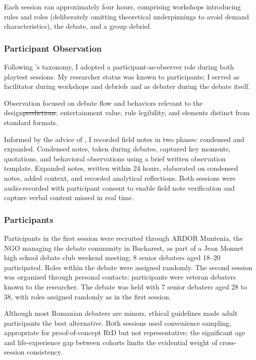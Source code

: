 \documentclass[12pt]{article}
\makeatletter
\providecommand{\DIFaddtex}[1]{{\protect\color[rgb]{0,0.5,0}\uwave{#1}}} %
\providecommand{\DIFdeltex}[1]{{\protect\color{red}\sout{#1}}} %
\providecommand{\DIFaddbegin}{} %
\providecommand{\DIFaddend}{} %
\providecommand{\DIFdelbegin}{} %
\providecommand{\DIFdelend}{} %
\providecommand{\DIFadd}[1]{\texorpdfstring{\DIFaddtex{#1}}{#1}} %
\providecommand{\DIFdel}[1]{\texorpdfstring{\DIFdeltex{#1}}{}} %
\providecommand{\DIFscaledelfig}{0.5}
\newlength{\DIFdelgraphicswidth} %
\newlength{\DIFdelgraphicsheight} %
\providecommand{\DIFaddincludegraphics}[2][]{{\color[rgb]{0,0.5,0}\fbox{\DIFOincludegraphics[#1]{#2}}}} %
\providecommand{\DIFdelincludegraphics}[2][]{%
\sbox{\DIFdelgraphicsbox}{\DIFOincludegraphics[#1]{#2}}%
\settoboxwidth{\DIFdelgraphicswidth}{\DIFdelgraphicsbox} %
\settoboxtotalheight{\DIFdelgraphicsheight}{\DIFdelgraphicsbox} %
\scalebox{\DIFscaledelfig}{%
\parbox[b]{\DIFdelgraphicswidth}{\usebox{\DIFdelgraphicsbox}\\[-\baselineskip] \rule{\DIFdelgraphicswidth}{0em}}\llap{\resizebox{\DIFdelgraphicswidth}{\DIFdelgraphicsheight}{%
\setlength{\unitlength}{\DIFdelgraphicswidth}%
\begin{picture}(1,1)%
\thicklines\linethickness{2pt} %
{\color[rgb]{1,0,0}\put(0,0){\framebox(1,1){}}}%
{\color[rgb]{1,0,0}\put(0,0){\line( 1,1){1}}}%
{\color[rgb]{1,0,0}\put(0,1){\line(1,-1){1}}}%
\end{picture}%
}\hspace*{3pt}}} %
} %
\DeclareRobustCommand{\DIFaddbegin}{\DIFOaddbegin \let\includegraphics\DIFaddincludegraphics} %
\DeclareRobustCommand{\DIFaddend}{\DIFOaddend \let\includegraphics\DIFOincludegraphics} %
\DeclareRobustCommand{\DIFdelbegin}{\DIFOdelbegin \let\includegraphics\DIFdelincludegraphics} %
\DeclareRobustCommand{\DIFdelend}{\DIFOaddend \let\includegraphics\DIFOincludegraphics} %
\let\sout@orig\sout %
\renewcommand{\sout}[1]{\ifmmode\text{\sout@orig{\ensuremath{#1}}}\else\sout@orig{#1}\fi} %
\makeatother
\begin{document}
Each session ran approximately four hours, comprising workshops introducing rules and roles (deliberately omitting theoretical underpinnings to avoid demand characteristics), the debate, and a group debrief.

\subsubsection{Participant Observation}

Following \textcite{baker2006observation}'s taxonomy, I adopted a participant-as-observer role during both playtest sessions. My researcher status was known to participants; I served as facilitator during workshops and debriefs and as debater during the debate itself.

Observation focused on debate flow and behaviors relevant to the design\DIFdelbegin \DIFdel{predictions}\DIFdelend \DIFaddbegin \DIFadd{'s intentions}\DIFaddend : entertainment value, rule legibility, and elements distinct from standard formats.

Informed by the advice of \textcite{spradley1980participant}, I recorded field notes in two phases: condensed and expanded. Condensed notes, taken during debates, captured key moments, quotations, and behavioral observations using a brief written observation template. Expanded notes, written within 24 hours, elaborated on condensed notes, added context, and recorded analytical reflections. Both sessions were audio-recorded with participant consent to enable field note verification and capture verbal content missed in real time.

\subsubsection{Participants}

Participants in the first session were recruited through ARDOR Muntenia, the NGO managing the debate community in Bucharest, as part of a Jean Monnet high school debate club weekend meeting; 8 senior debaters aged 18--20 participated. Roles within the debate were assigned randomly. The second session was organized through personal contacts: participants were veteran debaters known to the researcher. The debate was held with 7 senior debaters aged 28 to 38, with roles assigned randomly as in the first session.

Although most Romanian debaters are minors, ethical guidelines made adult participants the best alternative. Both sessions used convenience sampling, appropriate for proof-of-concept RtD but not representative; the significant age and life-experience gap between cohorts limits the evidential weight of cross-session consistency.
\end{document}
